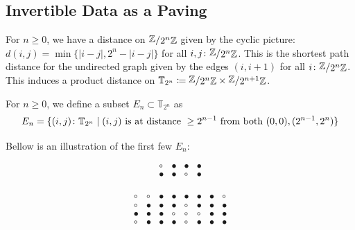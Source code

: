 \documentclass{article}
\newcommand{\quotient}[2]{{\raisebox{.2ex}{$#1$}/\raisebox{-.2ex}{$#2$}}}
\newcommand{\Bin}[1]{\quotient{\mathbb{Z}}{2^{#1}\mathbb{Z}}}
\newcommand{\Tau}[1]{\mathbb{T}_{2^{#1}}}
\begin{document}
\subsection{Invertible Data as a Paving}

For $n \geq 0$, we have a distance on $\Bin{n}$ given by the cyclic picture:
    $d(i,j) = \min\{|i-j|, 2^n - |i-j|\}$ for all $i,j \inset \Bin{n}$.
This is the shortest path distance for the undirected graph given by the edges $(i, i+1)$ for all $i \inset \Bin{n}$.
This induces a product distance on $\Tau{n} \coloneq \Bin{n} \times \Bin{n+1}$.

\begin{definition}
    For $n \geq 0$, we define a subset $E_n \subset \Tau{n}$ as
    \[
        E_n = \{(i,j) \inset \Tau{n} \mid (i,j) \textnormal{ is at distance } \geq 2^{n-1} \textnormal{ from both } (0,0), (2^{n-1},2^n)\}
    \]
\end{definition}

Bellow is an illustration of the first few $E_n$:

\[\begin{array}{cccc}
\circ & \bullet & \bullet & \bullet \\
\bullet & \bullet & \circ & \bullet \\
\end{array}\]


\[\begin{array}{cccccccc}
\circ & \circ & \bullet & \bullet & \bullet & \bullet & \bullet & \circ \\
\circ & \bullet & \bullet & \bullet & \circ & \bullet & \bullet & \bullet \\
\bullet & \bullet & \bullet & \circ & \circ & \circ & \bullet & \bullet \\
\circ & \bullet & \bullet & \bullet & \circ & \bullet & \bullet & \bullet \\
\end{array}\]
\end{document}

